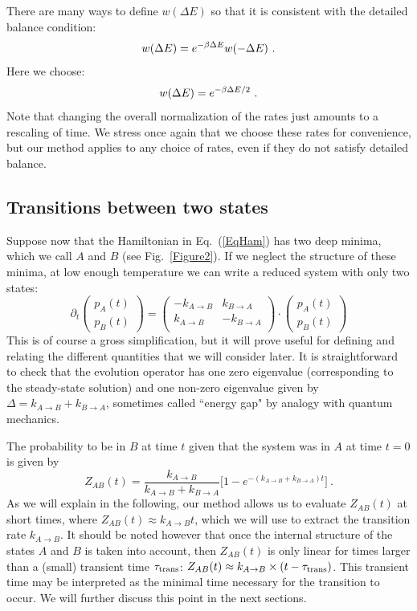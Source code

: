 \documentclass[aps,twocolumn,floats,pre,amsmath,superscriptaddress]{revtex4}
\newcommand{\beq}{\begin{equation}}
\newcommand{\eeq}{\end{equation}}
\let\D=\Delta \let\L=\Lambda \let\X=\Xi \let\P=\Pi
\def\to{\rightarrow} \def\la{\langle} \def\ra{\rangle}
\newcommand{\<}{\langle}
\renewcommand{\>}{\rangle}
\renewcommand{\P}{ \mathbb{P}}
\begin{document}
There are many ways to define $w(\Delta E)$ so that it is consistent with the detailed balance condition:
\beq
w(\Delta E) = e^{-\b \Delta E} w(-\Delta E) \ .
\eeq
Here we choose:
\beq\label{wrate}
w(\Delta E)= e^{-\b \Delta E/2} \ .
\eeq
Note that changing the overall normalization of the rates just amounts to a rescaling
of time. We stress once again that we choose these rates for convenience, but 
our method applies to any choice of rates, even if they do not satisfy detailed balance.

\subsection{Transitions between two states}


Suppose now that the Hamiltonian in Eq.~(\ref{EqHam}) has two deep minima, which we call $A$ and $B$ (see Fig.~\ref{Figure2}).
If we neglect the structure of these minima, at low enough temperature we can write a reduced system with only two states:
\beq
\partial_t \left( 
\begin{array}{c}
p_A(t) \\
p_B(t)
\end{array}
\right) = 
\left( 
\begin{array}{cc}
-k_{A\to B} & k_{B \to A} \\
k_{A \to B} & -k_{B\to A} \\
\end{array}
\right)
\cdot
\left( 
\begin{array}{c}
p_A(t) \\
p_B(t)
\end{array}
\right) 
\eeq
This is of course a gross simplification, but it will prove useful for defining and relating the different quantities that we will consider later.
It is straightforward to check that the evolution operator has one zero eigenvalue (corresponding to the steady-state solution) and one non-zero eigenvalue given by
$\D = k_{A\to B} + k_{B \to A}$, sometimes called ``energy gap" by analogy with quantum mechanics.

The probability to be in $B$ at time $t$ given that the system was in $A$ at time
$t=0$ is given by
\beq\label{ZABtwostates}
Z_{AB}(t) = \frac{k_{A \to B}}{ k_{A\to B} + k_{B \to A} } \big[ 1 - e^{-(k_{A\to B} + k_{B \to A}) t } \big] \ .
\eeq
As we will explain in the following, our method allows us to evaluate $Z_{AB}(t)$ at short times, where $Z_{AB}(t) \approx k_{A\to B} t$, which we will use to extract
the transition rate $k_{A \to B}$. 
It should be noted however that 
once the internal structure of the states $A$ and $B$ is taken into account,
then $Z_{AB}(t)$ is only linear for times larger than
a (small) transient time $\tau_{\rm trans}$: $Z_{AB}(t)\approx k_{A \to B}\times
(t-\tau_{\rm trans})$. This
transient time may be interpreted as the minimal time necessary for
the transition to occur. We will further discuss this point
in the next sections.
\end{document}
